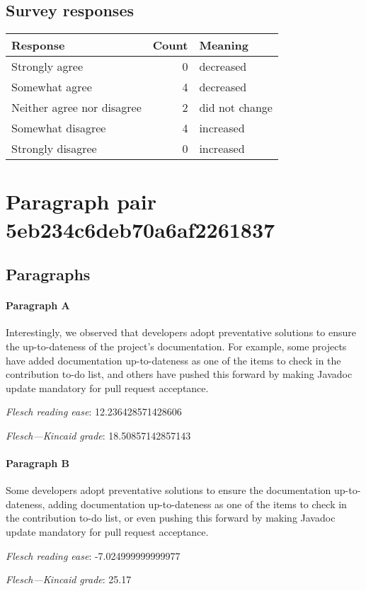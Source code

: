 \subsection{Survey responses}
\begin{tabular}{lrl}
\toprule
          \textbf{Response} &  \textbf{Count} & \textbf{Meaning} \\
\midrule
             Strongly agree &               0 &        decreased \\
             Somewhat agree &               4 &        decreased \\
 Neither agree nor disagree &               2 &   did not change \\
          Somewhat disagree &               4 &        increased \\
          Strongly disagree &               0 &        increased \\
\bottomrule
\end{tabular}

\section{Paragraph pair 5eb234c6deb70a6af2261837}
\subsection{Paragraphs}
\paragraph{Paragraph A}
Interestingly, we observed that developers adopt preventative solutions to ensure the up-to-dateness of the project's documentation. For example, some projects have added documentation up-to-dateness as one of the items to check in the contribution to-do list, and others have pushed this forward by making Javadoc update mandatory for pull request acceptance.\par\medskip\emph{Flesch reading ease}: 12.236428571428606\par\emph{Flesch---Kincaid grade}: 18.50857142857143

\paragraph{Paragraph B}
Some developers adopt preventative solutions to ensure the documentation up-to-dateness, adding documentation up-to-dateness as one of the items to check in the contribution to-do list, or even pushing this forward by making Javadoc update mandatory for pull request acceptance.\par\medskip\emph{Flesch reading ease}: -7.024999999999977\par\emph{Flesch---Kincaid grade}: 25.17

